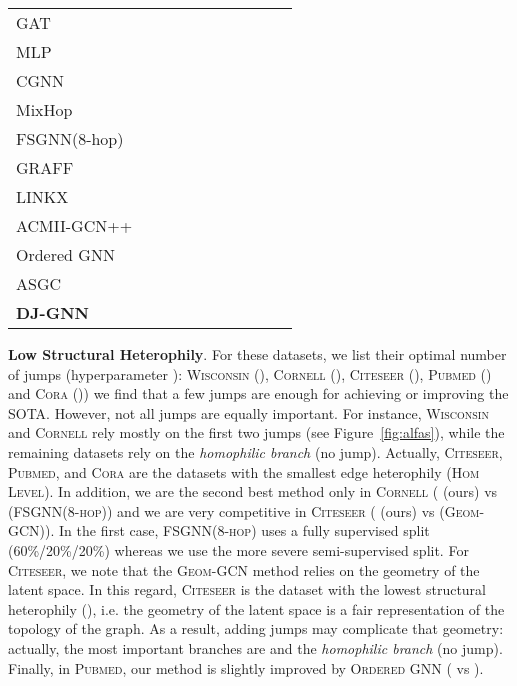 \documentclass{article}
\theoremstyle{plain}
\theoremstyle{definition}
\begin{document}
\begin{table*}[ht]
\begin{center}
\begin{small}
\begin{sc}
{\begin{tabular}{l c c c c c c c c c}
                GAT\citep{velickovic2018gat} &  &  &  &  &  &  &  &  & \\
                MLP &  &  &  &  &  &  &  &  & \\
CGNN\citep{CGNN} &  &  &  &  &  &  &  &  & \\
                MixHop~\citep{mixhop19} &  &  &  &  &  &  &  &  & \\
                FSGNN(8-hop)~\citep{FSGNN21} &  &  &  &  &  &  &  &  & \\
GRAFF~\citep{GRAFF} &  &  &  &  &  &  &  &  & \\
                LINKX~\citep{LINKX21} &  &  &  &  &  &  &  &  & \\

                ACMII-GCN++~\citep{ACM} &  &  &  &  &  &  &  &  & \\
                Ordered GNN~\citep{song2023ordered} &  &  &  &  &  &  &  &  & 
                \\
                ASGC~\citep{chanpuriya2022simplified} &  &  &  &  &  &  &  &  & 
                \\
\midrule
                \textbf{DJ-GNN} &  &  &  &  &  &  &  &  &  \\
                \bottomrule
\end{tabular}
}
\end{sc}
\end{small}
\end{center}
\end{table*}



\textbf{Low Structural Heterophily}. For these datasets, we list their optimal number of jumps (hyperparameter ): \textsc{Wisconsin} (), \textsc{Cornell} (), \textsc{Citeseer} (), \textsc{Pubmed} () and \textsc{Cora} ()) we find that a few jumps are enough for achieving or improving the SOTA. However, not all jumps are equally important. For instance, \textsc{Wisconsin} and \textsc{Cornell} rely mostly on the first two jumps (see Figure{~\ref{fig:alfas}}), while the remaining datasets rely on the \emph{homophilic branch} (no jump). Actually, \textsc{Citeseer}, \textsc{Pubmed}, and \textsc{Cora} are the datasets with the smallest edge heterophily (\textsc{Hom Level}). In addition, we are the second best method only in \textsc{Cornell} ( (ours) vs  (\textsc{FSGNN(8-hop)}) and we are very competitive in \textsc{Citeseer} ( (ours) vs  (\textsc{Geom-GCN})). In the first case, \textsc{FSGNN(8-hop)} uses a fully supervised split (60\%/20\%/20\%) whereas we use the more severe semi-supervised split. For \textsc{Citeseer}, we note that the \textsc{Geom-GCN} method relies on the geometry of the latent space. In this regard, \textsc{Citeseer} is the dataset with the lowest structural heterophily (), i.e. the geometry of the latent space is a fair representation of the topology of the graph. As a result, adding jumps may complicate that geometry: actually, the most important branches are  and the \emph{homophilic branch} (no jump). Finally, in \textsc{Pubmed}, our method is slightly improved by \textsc{Ordered GNN} ( vs ). \\
\end{document}
